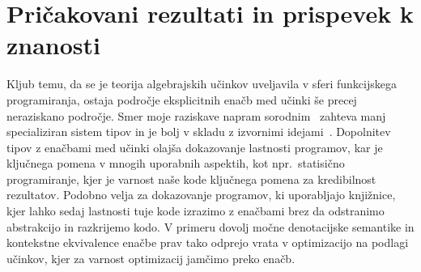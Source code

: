 \documentclass{article}
\begin{document}
\section*{Pričakovani rezultati in prispevek k znanosti}

Kljub temu, da se je teorija algebrajskih učinkov uveljavila v sferi funkcijskega programiranja, ostaja področje eksplicitnih enačb med učinki še precej neraziskano področje. Smer moje raziskave napram sorodnim~\cite{DBLP:journals/pacmpl/Ahman18} zahteva manj specializiran sistem tipov in je bolj v skladu z izvornimi idejami~\cite{DBLP:conf/esop/PlotkinP09}. Dopolnitev tipov z enačbami med učinki olajša dokazovanje lastnosti programov, kar je ključnega pomena v mnogih uporabnih aspektih, kot npr.\ statisično programiranje, kjer je varnost naše kode ključnega pomena za kredibilnost rezultatov. Podobno velja za dokazovanje programov, ki uporabljajo knjižnice, kjer lahko sedaj lastnosti tuje kode izrazimo z enačbami brez da odstranimo abstrakcijo in razkrijemo kodo. V primeru dovolj močne denotacijske semantike in kontekstne ekvivalence enačbe prav tako odprejo vrata v optimizacijo na podlagi učinkov, kjer za varnost optimizacij jamčimo preko enačb.

\renewcommand\refname{Literatura}


\end{document}
